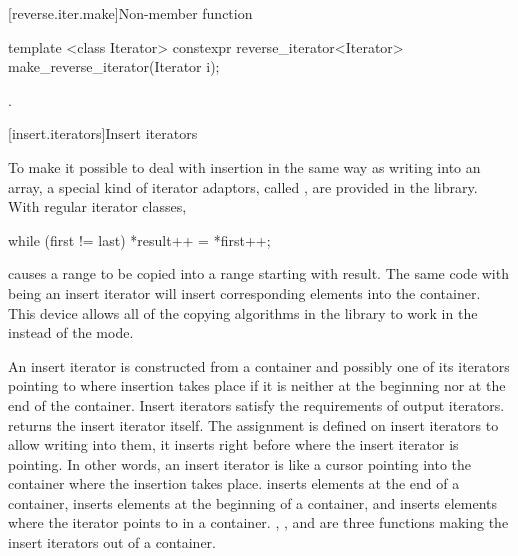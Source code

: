 [reverse.iter.make]{Non-member function }

%
%
\begin{itemdecl}
template <class Iterator>
  constexpr reverse_iterator<Iterator> make_reverse_iterator(Iterator i);
\end{itemdecl}

\begin{itemdescr}
\pnum
\returns
{}.
\end{itemdescr}

[insert.iterators]{Insert iterators}

\pnum
To make it possible to deal with insertion in the same way as writing into an array, a special kind of iterator
adaptors, called
,
are provided in the library.
With regular iterator classes,

\begin{codeblock}
while (first != last) *result++ = *first++;
\end{codeblock}

causes a range 
to be copied into a range starting with result.
The same code with
being an insert iterator will insert corresponding elements into the container.
This device allows all of the
copying algorithms in the library to work in the
instead of the  mode.

\pnum
An insert iterator is constructed from a container and possibly one of its iterators pointing to where
insertion takes place if it is neither at the beginning nor at the end of the container.
Insert iterators satisfy the requirements of output iterators.
returns the insert iterator itself.
The assignment
is defined on insert iterators to allow writing into them, it inserts
right before where the insert iterator is pointing.
In other words, an insert iterator is like a cursor pointing into the
container where the insertion takes place.
inserts elements at the end of a container,
inserts elements at the beginning of a container, and
inserts elements where the iterator points to in a container.
,
,
and
are three
functions making the insert iterators out of a container.


